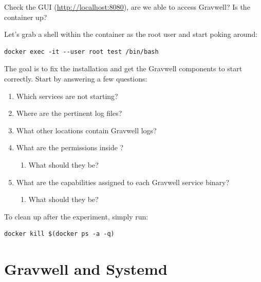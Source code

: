 Check the GUI (\href{http://localhost:8080}{http://localhost:8080}), are we able to access Gravwell? Is the container up?

Let's grab a shell within the container as the root user and start
poking around:

\begin{Verbatim}[breaklines=true]
docker exec -it --user root test /bin/bash
\end{Verbatim}

The goal is to fix the installation and get the Gravwell components to
start correctly. Start by answering a few questions:

\begin{enumerate}
\item
  Which services are not starting?
\item
  Where are the pertinent log files?
\item
  What other locations contain Gravwell logs?
\item
  What are the permissions inside ?
	\begin{enumerate}
	\item
	  What should they be?
	\end{enumerate}
\item
  What are the capabilities assigned to each Gravwell service binary?
	\begin{enumerate}
	\item
	  What should they be?
	\end{enumerate}
\end{enumerate}

To clean up after the experiment, simply run:

\begin{Verbatim}[breaklines=true]
docker kill $(docker ps -a -q)
\end{Verbatim}



\section{Gravwell and Systemd}

